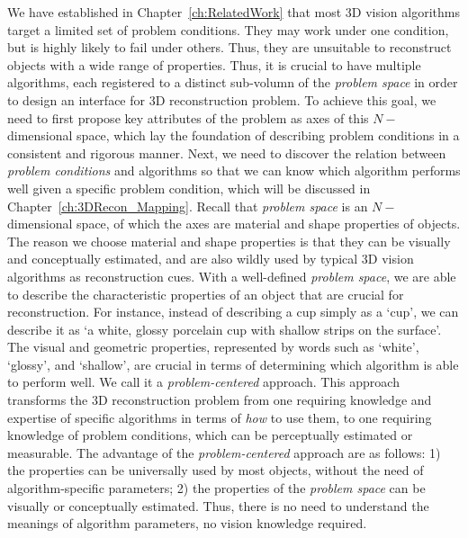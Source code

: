 We have established in Chapter~\ref{ch:RelatedWork} that most 3D vision algorithms target a limited set of problem conditions. They may work under one condition, but is highly likely to fail under others. Thus, they are unsuitable to reconstruct objects with a wide range of properties. Thus, it is crucial to have multiple algorithms, each registered to a distinct sub-volumn of the \textit{problem space} in order to design an interface for 3D reconstruction problem. To achieve this goal, we need to first propose key attributes of the problem as axes of this $N-$dimensional space, which lay the foundation of describing problem conditions in a consistent and rigorous manner. Next, we need to discover the relation between \textit{problem conditions} and algorithms so that we can know which algorithm performs well given a specific problem condition, which will be discussed in Chapter~\ref{ch:3DRecon_Mapping}. Recall that \textit{problem space} is an $N-$dimensional space, of which the axes are material and shape properties of objects. The reason we choose material and shape properties is that they can be visually and conceptually estimated, and are also wildly used by typical 3D vision algorithms as reconstruction cues. With a well-defined \textit{problem space}, we are able to describe the characteristic properties of an object that are crucial for reconstruction. For instance, instead of describing a cup simply as a `cup', we can describe it as `a white, glossy porcelain cup with shallow strips on the surface'. The visual and geometric properties, represented by words such as `white', `glossy', and `shallow', are crucial in terms of determining which algorithm is able to perform well. We call it a \textit{problem-centered} approach. This approach transforms the 3D reconstruction problem from one requiring knowledge and expertise of specific algorithms in terms of \textit{how} to use them, to one requiring knowledge of problem conditions, which can be perceptually estimated or measurable. The advantage of the \textit{problem-centered} approach are as follows: 1) the properties can be universally used by most objects, without the need of algorithm-specific parameters; 2) the properties of the \textit{problem space} can be visually or conceptually estimated. Thus, there is no need to understand the meanings of algorithm parameters, \ie no vision knowledge required.


